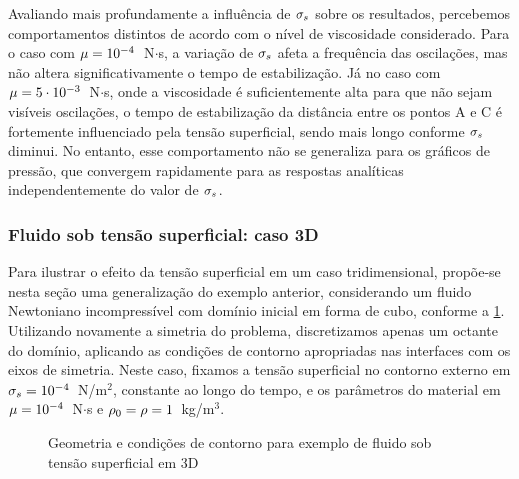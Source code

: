 \documentclass[Tese.tex]{subfiles}
\begin{document}
Avaliando mais profundamente a influência de $\sigma_s$ sobre os resultados, percebemos comportamentos distintos de acordo com o nível de viscosidade considerado. Para o caso com $\mu = 10^{-4}$~N$\cdot$s, a variação de $\sigma_s$ afeta a frequência das oscilações, mas não altera significativamente o tempo de estabilização. Já no caso com $\mu = 5\cdot 10^{-3}$~N$\cdot$s, onde a viscosidade é suficientemente alta para que não sejam visíveis oscilações, o tempo de estabilização da distância entre os pontos A e C é fortemente influenciado pela tensão superficial, sendo mais longo conforme $\sigma_s$ diminui. No entanto, esse comportamento não se generaliza para os gráficos de pressão, que convergem rapidamente para as respostas analíticas independentemente do valor de $\sigma_s$.

\subsubsection{Fluido sob tensão superficial: caso 3D}

Para ilustrar o efeito da tensão superficial em um caso tridimensional, propõe-se nesta seção uma generalização do exemplo anterior, considerando um fluido Newtoniano incompressível com domínio inicial em forma de cubo, conforme a \cref{fig:SurfaceTension3D}. Utilizando novamente a simetria do problema, discretizamos apenas um octante do domínio, aplicando as condições de contorno apropriadas nas interfaces com os eixos de simetria. Neste caso, fixamos a tensão superficial no contorno externo em $\sigma_s = 10^{-4}$~N/m$^2$, constante ao longo do tempo, e os parâmetros do material em $\mu = 10^{-4}$~N$\cdot$s e $\rho_0 = \rho = 1$~kg/m$^3$.

\begin{figure}[!htb]
	\centering
	\caption{Geometria e condições de contorno para exemplo de fluido sob tensão superficial em 3D}
	\label{fig:SurfaceTension3D}
	{\small
		\noindent{}
	}	
\end{figure}
\end{document}
